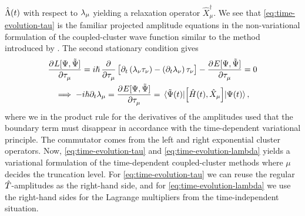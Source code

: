         $\hat{\Lambda}(t)$ with respect to $\lambda_{\mu}$ yielding a relaxation
        operator $\hat{X}^{\dagger}_{\mu}$.
        We see that \autoref{eq:time-evolution-tau} is the familiar projected
        amplitude equations in the non-variational formulation of the
        coupled-cluster wave function similar to the method introduced by
        \citeauthor{tdcc-hoodbhoy} \cite{tdcc-hoodbhoy, tdcc-hoodbhoy-2}.
        The second stationary condition gives
        \begin{gather}
            \dpd{L[\Psi, \tilde{\Psi}]}{\clustamp_{\mu}}
            = i\hslash\dpd{}{\clustamp_{\mu}}\brak{
                \partial_t\para{
                    \clustlamp_{\nu}
                    \clustamp_{\nu}
                }
                - \para{\partial_t\clustlamp_{\nu}}
                \clustamp_{\nu}
            }
            - \dpd{E[\Psi, \tilde{\Psi}]}{\clustamp_{\mu}}
            = 0 \\
            \implies
            -i\hslash\partial_t\clustlamp_{\mu}
            =
            \dpd{E[\Psi, \tilde{\Psi}]}{\clustamp_{\mu}}
            =
            \mel*{\tilde{\Psi}(t)}{
                \com{\hamil(t)}{\hat{X}_{\mu}}
            }{\Psi(t)},
            \label{eq:time-evolution-lambda}
        \end{gather}
        where we in the product rule for the derivatives of the amplitudes used
        that the boundary term must disappear in accordance with the
        time-dependent variational principle.
        The commutator comes from the left and right exponential cluster
        operators.
        Now, \autoref{eq:time-evolution-tau} and
        \autoref{eq:time-evolution-lambda} yields a variational formulation of
        the time-dependent coupled-cluster methods where $\mu$ decides the
        truncation level.
        For \autoref{eq:time-evolution-tau} we can reuse the regular
        $\hat{T}$-amplitudes as the right-hand side, and for
        \autoref{eq:time-evolution-lambda} we use the right-hand sides for the
        Lagrange multipliers from the time-independent situation.

